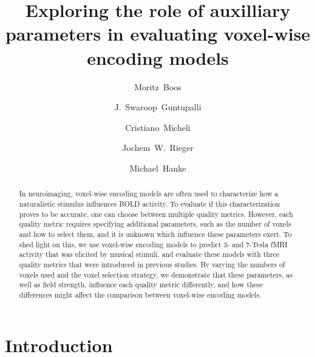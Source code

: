 
\newcommand{\beginsupplement}{%
        \setcounter{table}{0}
        \renewcommand{\thetable}{S\arabic{table}}%
        \setcounter{figure}{0}
        \renewcommand{\thefigure}{S\arabic{figure}}%
     }




\title{Exploring the role of auxilliary parameters in evaluating voxel-wise encoding models}


\author[1]{Moritz~Boos}
\author[2]{J.~Swaroop~Guntupalli}
\author[1]{Cristiano~Micheli}
\author[1]{Jochem~W.~Rieger}
\author[3,4]{Michael~Hanke}

\maketitle

\listoftodos

\begin{abstract}
In neuroimaging, voxel-wise encoding models are often used to characterize how a
naturalistic stimulus influences BOLD activity.
To evaluate if this characterization proves to be accurate, one can choose
between multiple quality metrics.
However, each quality metric requires specifying additional parameters, such as
the number of voxels and how to select them, and it is unknown which influence
these parameters exert.
To shed light on this, we use voxel-wise encoding models to predict 3- and 7-Tesla fMRI activity that was elicited by musical stimuli,
and evaluate these models with three quality metrics that were introduced in previous studies.
By varying the numbers of voxels used and the voxel selection strategy, we
demonstrate that these parameters, as well as field strength, influence each quality metric
differently, and how these differences might affect the comparison between
    voxel-wise encoding models.
\end{abstract}

\clearpage


\section*{Introduction}

